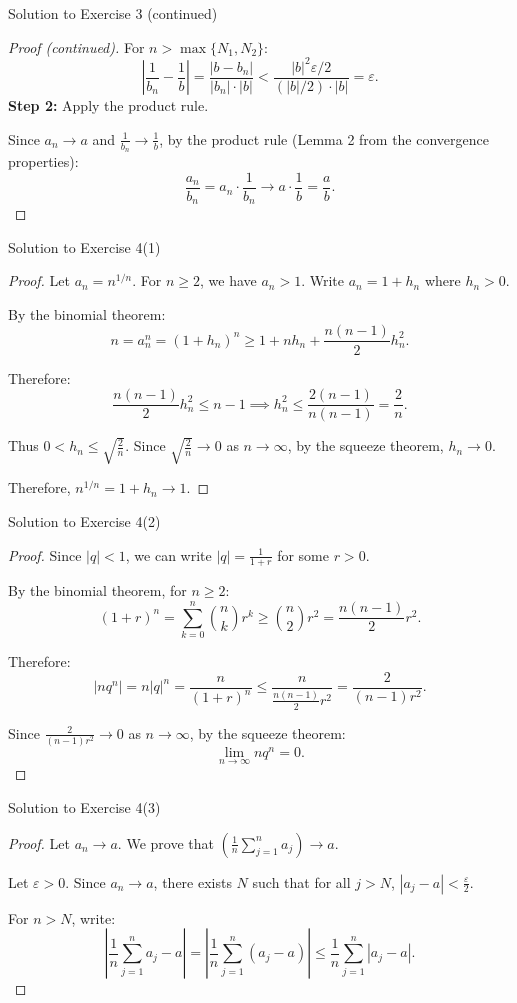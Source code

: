 \documentclass[dvipsnames]{beamer}
\theoremstyle{plain}
\theoremstyle{definition}
\begin{document}
\begin{frame}{Solution to Exercise 3 (continued)}
\begin{proof}[Proof (continued)]
For \(n > \max\{N_1, N_2\}\):
\[
\left| \frac{1}{b_n} - \frac{1}{b} \right| = \frac{|b - b_n|}{|b_n| \cdot |b|} < \frac{|b|^2 \varepsilon / 2}{(|b|/2) \cdot |b|} = \varepsilon.
\]
\textbf{Step 2:} Apply the product rule.

Since \(a_n \to a\) and \(\frac{1}{b_n} \to \frac{1}{b}\), by the product rule (Lemma 2 from the convergence properties):
\[
\frac{a_n}{b_n} = a_n \cdot \frac{1}{b_n} \to a \cdot \frac{1}{b} = \frac{a}{b}.
\]
\end{proof}
\end{frame}

\begin{frame}{Solution to Exercise 4(1)}
\begin{proof}
Let \(a_n = n^{1/n}\). For \(n \ge 2\), we have \(a_n > 1\). Write \(a_n = 1 + h_n\) where \(h_n > 0\).

By the binomial theorem:
\[
n = a_n^n = (1 + h_n)^n \ge 1 + nh_n + \frac{n(n-1)}{2}h_n^2.
\]

Therefore:
\[
\frac{n(n-1)}{2}h_n^2 \le n - 1 \implies h_n^2 \le \frac{2(n-1)}{n(n-1)} = \frac{2}{n}.
\]

Thus \(0 < h_n \le \sqrt{\frac{2}{n}}\). Since \(\sqrt{\frac{2}{n}} \to 0\) as \(n \to \infty\), by the squeeze theorem, \(h_n \to 0\).

Therefore, \(n^{1/n} = 1 + h_n \to 1\).
\end{proof}
\end{frame}

\begin{frame}{Solution to Exercise 4(2)}
\begin{proof}
  \small
Since \(|q| < 1\), we can write \(|q| = \frac{1}{1+r}\) for some \(r > 0\).

By the binomial theorem, for \(n \ge 2\):
\[
(1+r)^n = \sum_{k=0}^{n} \binom{n}{k} r^k \ge \binom{n}{2} r^2 = \frac{n(n-1)}{2}r^2.
\]

Therefore:
\[
|nq^n| = n|q|^n = \frac{n}{(1+r)^n} \le \frac{n}{\frac{n(n-1)}{2}r^2} = \frac{2}{(n-1)r^2}.
\]

Since \(\displaystyle \frac{2}{(n-1)r^2} \to 0\) as \(n \to \infty\), by the squeeze theorem:
\[
\lim_{n \to \infty} nq^n = 0.
\]
\end{proof}
\end{frame}

\begin{frame}{Solution to Exercise 4(3)}
\begin{proof}
Let \(a_n \to a\). We prove that \(\displaystyle \left(\frac{1}{n}\sum_{j=1}^{n} a_j\right) \to a\).

Let \(\varepsilon > 0\). Since \(a_n \to a\), there exists \(N\) such that for all \(j > N\), \(|a_j - a| < \frac{\varepsilon}{2}\).

For \(n > N\), write:
\[
\left| \frac{1}{n}\sum_{j=1}^{n} a_j - a \right| = \left| \frac{1}{n}\sum_{j=1}^{n} (a_j - a) \right| \le \frac{1}{n}\sum_{j=1}^{n} |a_j - a|.
\]
\end{proof}
\end{frame}
\end{document}
